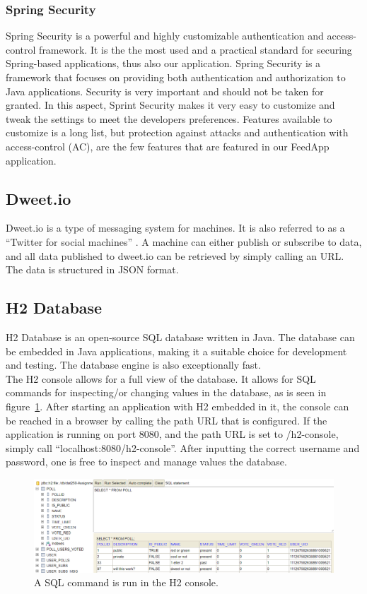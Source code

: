 \subsubsection{Spring Security}
Spring Security is a powerful and highly customizable authentication and access-control framework. It is the the most used and a practical standard for securing Spring-based applications, thus also our application. Spring Security is a framework that focuses on providing both authentication and authorization to Java applications.\cite{springsecurity} Security is very important and should not be taken for granted. In this aspect, Sprint Security makes it very easy to customize and tweak the settings to meet the developers preferences. Features available to customize is a long list, but protection against attacks and authentication with access-control (AC), are the few features that are featured in our FeedApp application.
\subsection{Dweet.io}
\label{sub:dweet}
Dweet.io is a type of messaging system for machines. It is also referred to as a “Twitter for social machines” \cite{dweet}. A machine can either publish or subscribe to data, and all data published to dweet.io can be retrieved by simply calling an URL. The data is structured in JSON format. 

\subsection{H2 Database}
\label{sub:h2db}
H2 Database is an open-source SQL database written in Java. The database can be embedded in Java applications, making it a suitable choice for development and testing. The database engine is also exceptionally fast. \cite{h2db} \\[\baselineskip]
The H2 console allows for a full view of the database. It allows for SQL commands for inspecting/or changing values in the database, as is seen in figure~\ref{fig:h2console}. After starting an application with H2 embedded in it, the console can be reached in a browser by calling the path URL that is configured. If the application is running on port 8080, and the path URL is set to /h2-console, \\simply call “localhost:8080/h2-console”. After inputting the correct username and password, one is free to inspect and manage values the database. 
\begin{figure}[H]
  \centering
  \includegraphics[scale=0.45]{figs/h2cons.png}
  \caption[scale=0.5]{A SQL command is run in the H2 console.}
  \label{fig:h2console}
\end{figure}

